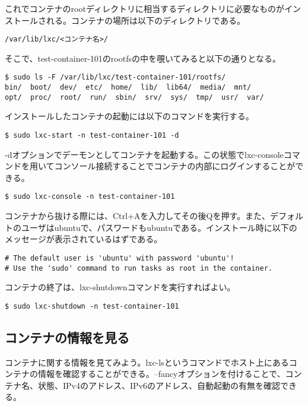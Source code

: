 \documentclass[9pt,b5paper,tombo]{jsbook}
\begin{document}
\noindent
これでコンテナのrootディレクトリに相当するディレクトリに必要なものがインストールされる。コンテナの場所は以下のディレクトリである。

\begin{lstlisting}
/var/lib/lxc/<コンテナ名>/
\end{lstlisting}

\noindent
そこで、test-container-101のrootfsの中を覗いてみると以下の通りとなる。

\begin{lstlisting}
$ sudo ls -F /var/lib/lxc/test-container-101/rootfs/
bin/  boot/  dev/  etc/  home/	lib/  lib64/  media/  mnt/
opt/  proc/  root/	run/  sbin/  srv/  sys/  tmp/  usr/  var/
\end{lstlisting}

\newpage

\noindent
インストールしたコンテナの起動には以下のコマンドを実行する。

\begin{lstlisting}
$ sudo lxc-start -n test-container-101 -d
\end{lstlisting}

\noindent
-dオプションでデーモンとしてコンテナを起動する。この状態でlxc-consoleコマンドを用いてコンソール接続することでコンテナの内部にログインすることができる。

\begin{lstlisting}
$ sudo lxc-console -n test-container-101
\end{lstlisting}

\noindent
コンテナから抜ける際には、Ctrl+Aを入力してその後Qを押す。また、デフォルトのユーザはubuntuで、パスワードもubuntuである。インストール時に以下のメッセージが表示されているはずである。

\begin{lstlisting}
# The default user is 'ubuntu' with password 'ubuntu'!
# Use the 'sudo' command to run tasks as root in the container.
\end{lstlisting}

\noindent
コンテナの終了は、lxc-shutdownコマンドを実行すればよい。

\begin{lstlisting}
$ sudo lxc-shutdown -n test-container-101
\end{lstlisting}


\subsection{コンテナの情報を見る}
コンテナに関する情報を見てみよう。lxc-lsというコマンドでホスト上にあるコンテナの情報を確認することができる。--fancyオプションを付けることで、コンテナ名、状態、IPv4のアドレス、IPv6のアドレス、自動起動の有無を確認できる。
\end{document}
